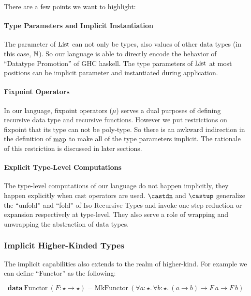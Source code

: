 There are a few points we want to highlight:

\paragraph{Type Parameters and Implicit Instantiation}

The parameter of $\mathrm{List}$ can not only be types, also values of other data types
(in this case, $\mathbb{N}$). So our language is able to directly encode the behavior of
``Datatype Promotion'' of GHC haskell. The type parameters of $\mathrm{List}$ at most
positions can be implicit parameter and instantiated during application.

\paragraph{Fixpoint Operators}
In our language, fixpoint operators ($\mu$) serves a dual purposes of defining
recursive data type and recursive functions. However we put restrictions on
fixpoint that its type can not be poly-type. So there is an awkward indirection
in the definition of $\mathrm{map}$ to make all of the type parameters implicit. The rationale
of this restriction is discussed in later sections.

\paragraph{Explicit Type-Level Computations}
The type-level computations of our language do not happen implicitly, they happen
explicitly when $\mathrm{cast}$ operators are used. $\castdn$ and $\castup$
generalize the ``unfold'' and ``fold'' of Iso-Recursive Types and invoke
one-step reduction or expansion respectively at type-level.
They also serve a role of wrapping and unwrapping the abstraction of data types.

\subsubsection{Implicit Higher-Kinded Types}

The implicit capabilities also extends to the realm of higher-kind. For example
we can define ``Functor'' as the following:

\newcommand{\Functor}[0]{\mathrm{Functor}}
\newcommand{\MkFunctor}[0]{\mathrm{MkFunctor}}
\newcommand{\Id}[0]{\mathrm{Id}}
\newcommand{\MkId}[0]{\mathrm{MkId}}

\begin{equation*}
  \mathbf{data}~\Functor~(F : \star \rightarrow \star) = \MkFunctor~(\forall a : \star.\, \forall b : \star.\, (a \rightarrow b) \rightarrow F~a \rightarrow F~b)
\end{equation*}

